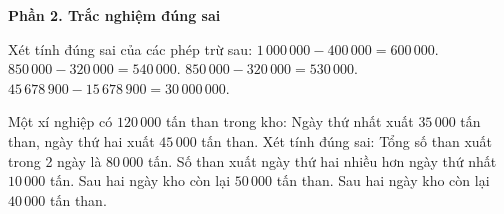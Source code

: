 \textbf{Phần 2. Trắc nghiệm đúng sai}

\begin{ex} %
Xét tính đúng sai của các phép trừ sau:
\choiceTF
{\True $1\,000\,000 - 400\,000 = 600\,000$.}
{$850\,000 - 320\,000 = 540\,000$.}
{\True $850\,000 - 320\,000 = 530\,000$.}
{\True $45\,678\,900 - 15\,678\,900 = 30\,000\,000$.}
\end{ex}

\begin{ex} %
Một xí nghiệp có $120\,000$ tấn than trong kho: Ngày thứ nhất xuất $35\,000$ tấn than, ngày thứ hai xuất $45\,000$ tấn than. Xét tính đúng sai:
\choiceTF
{\True Tổng số than xuất trong 2 ngày là $80\,000$ tấn.}
{\True Số than xuất ngày thứ hai nhiều hơn ngày thứ nhất $10\,000$ tấn.}
{Sau hai ngày kho còn lại $50\,000$ tấn than.}
{\True Sau hai ngày kho còn lại $40\,000$ tấn than.}
\end{ex}

